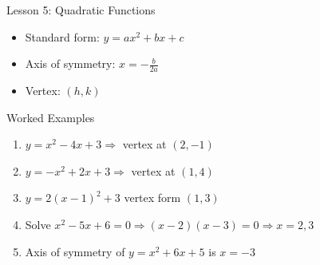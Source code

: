 \documentclass{beamer}
\begin{document}
\begin{frame}{Lesson 5: Quadratic Functions}
\begin{itemize}
  \item Standard form: $y = ax^2 + bx + c$
  \item Axis of symmetry: $x = -\frac{b}{2a}$
  \item Vertex: $(h, k)$
\end{itemize}
\end{frame}

\begin{frame}{Worked Examples}
\begin{enumerate}
  \item $y = x^2 - 4x + 3 \Rightarrow$ vertex at $(2, -1)$
  \item $y = -x^2 + 2x + 3 \Rightarrow$ vertex at $(1, 4)$
  \item $y = 2(x - 1)^2 + 3$ vertex form $(1, 3)$
  \item Solve $x^2 - 5x + 6 = 0 \Rightarrow (x - 2)(x - 3) = 0 \Rightarrow x = 2,3$
  \item Axis of symmetry of $y = x^2 + 6x + 5$ is $x = -3$
\end{enumerate}
\end{frame}
\end{document}
